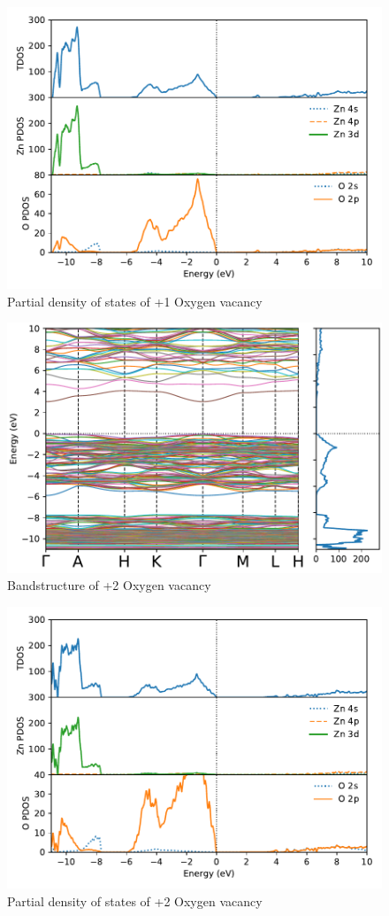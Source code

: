 \begin{figure}[tbh!]
	\centering
	\includegraphics[width=0.7\linewidth]{"images/rnd/dos-pdos_O_vac-p1"}
	\caption[Partial density of states of +1 Oxygen vacancy]{Partial density of states of +1 Oxygen vacancy}
\end{figure}

\begin{figure}[tbh!]
	\centering
	\includegraphics[width=0.7\linewidth]{"images/rnd/band-dos_O_vac-p2"}
	\caption[Bandstructure of +2 Oxygen vacancy]{Bandstructure of +2 Oxygen vacancy}
\end{figure}

\begin{figure}[tbh!]
	\centering
	\includegraphics[width=0.7\linewidth]{"images/rnd/dos-pdos_O_vac-p2"}
	\caption[Partial density of states of +2 Oxygen vacancy]{Partial density of states of +2 Oxygen vacancy}
\end{figure}

